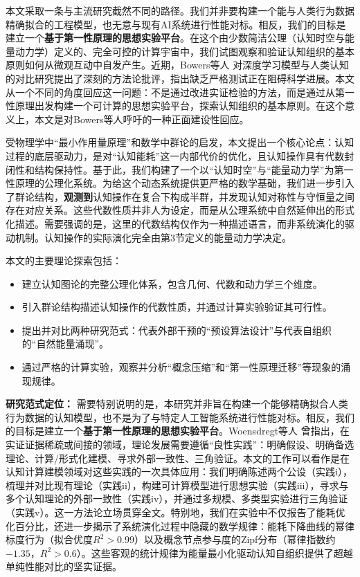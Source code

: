 \documentclass[12pt,a4paper]{article}
\begin{document}
本文采取一条与主流研究截然不同的路径。我们并非要构建一个能与人类行为数据精确拟合的工程模型，也无意与现有AI系统进行性能对标。相反，我们的目标是建立一个\textbf{基于第一性原理的思想实验平台}。在这个由少数简洁公理（认知时空与能量动力学）定义的、完全可控的计算宇宙中，我们试图观察和验证认知组织的基本原则如何从微观互动中自发产生。近期，Bowers等人 \cite{bowers2023importance} 对深度学习模型与人类认知的对比研究提出了深刻的方法论批评，指出缺乏严格测试正在阻碍科学进展。本文从一个不同的角度回应这一问题：不是通过改进实证检验的方法，而是通过从第一性原理出发构建一个可计算的思想实验平台，探索认知组织的基本原则。在这个意义上，本文是对Bowers等人呼吁的一种正面建设性回应。

受物理学中“最小作用量原理”和数学中群论的启发，本文提出一个核心论点：认知过程的底层驱动力，是对“认知能耗”这一内部代价的优化，且认知操作具有代数封闭性和结构保持性。基于此，我们构建了一个以“认知时空”与“能量动力学”为第一性原理的公理化系统。为给这个动态系统提供更严格的数学基础，我们进一步引入了群论结构，\textbf{观测到}认知操作在复合下构成半群，并发现认知对称性与守恒量之间存在对应关系。这些代数性质并非人为设定，而是从公理系统中自然延伸出的形式化描述。需要强调的是，这里的代数结构仅作为一种描述语言，而非系统演化的驱动机制。认知操作的实际演化完全由第3节定义的能量动力学决定。

本文的主要理论探索包括：
\begin{itemize}
    \item 建立认知图论的完整公理化体系，包含几何、代数和动力学三个维度。
    \item 引入群论结构描述认知操作的代数性质，并通过计算实验验证其可行性。
    \item 提出并对比两种研究范式：代表外部干预的“预设算法设计”与代表自组织的“自然能量涌现”。
    \item 通过严格的计算实验，观察并分析“概念压缩”和“第一性原理迁移”等现象的涌现规律。
\end{itemize}

\textbf{研究范式定位：} 需要特别说明的是，本研究并非旨在构建一个能够精确拟合人类行为数据的认知模型，也不是为了与特定人工智能系统进行性能对标。相反，我们的目标是建立一个\textbf{基于第一性原理的思想实验平台}。Woensdregt等人 \cite{woensdregt2024lessons} 曾指出，在实证证据稀疏或间接的领域，理论发展需要遵循“良性实践”：明确假设、明确备选理论、计算/形式化建模、寻求外部一致性、三角验证。本文的工作可以看作是在认知计算建模领域对这些实践的一次具体应用：我们明确陈述两个公设（实践i），梳理并对比现有理论（实践ii），构建可计算模型进行思想实验（实践iii），寻求与多个认知理论的外部一致性（实践iv），并通过多规模、多类型实验进行三角验证（实践v）。这一方法论立场贯穿全文。特别地，我们在实验中不仅报告了能耗优化百分比，还进一步揭示了系统演化过程中隐藏的数学规律：能耗下降曲线的幂律标度行为（拟合优度\(R^2>0.99\)）以及概念节点参与度的Zipf分布（幂律指数约\(-1.35\)，\(R^2>0.6\)）。这些客观的统计规律为能量最小化驱动认知自组织提供了超越单纯性能对比的坚实证据。
\end{document}

